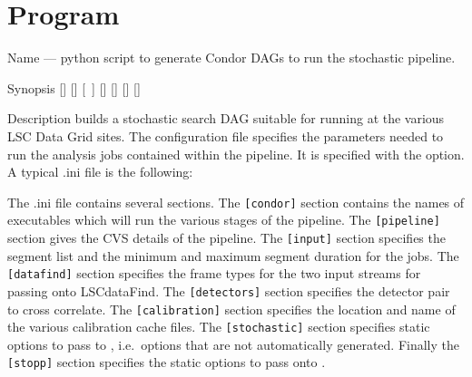 \clearpage
\section{Program }
\label{program:lalapps-stochastic-pipe}

\begin{entry}
\item[Name]
 --- python script to generate Condor DAGs
to run the stochastic pipeline.

\item[Synopsis]
 \newline \hspace*{0.5in}
[] \newline \hspace*{0.5in}
[] \newline \hspace*{0.5in}
[~] \newline \hspace*{0.5in}
[] \newline \hspace*{0.5in}
[] \newline \hspace*{0.5in}
[] \newline \hspace*{0.5in}
[] \newline \hspace*{0.5in}
~ \newline \hspace*{0.5in}
~

\item[Description]  builds a stochastic
search DAG suitable for running at the various LSC Data Grid sites. The
configuration file specifies the parameters needed to run the analysis
jobs contained within the pipeline. It is specified with the
 option. A typical .ini file is the following:



The .ini file contains several sections. The \verb$[condor]$ section
contains the names of executables which will run the various stages of
the pipeline. The \verb$[pipeline]$ section gives the CVS details of the
pipeline. The \verb$[input]$ section specifies the segment list and the
minimum and maximum segment duration for the jobs. The \verb$[datafind]$
section specifies the frame types for the two input streams for passing
onto LSCdataFind. The \verb$[detectors]$ section specifies the detector
pair to cross correlate. The \verb$[calibration]$ section specifies the
location and name of the various calibration cache files. The
\verb$[stochastic]$ section specifies static options to pass to
, i.e.~options that are not automatically
generated. Finally the \verb$[stopp]$ section specifies the static
options to pass onto .


\end{entry}
